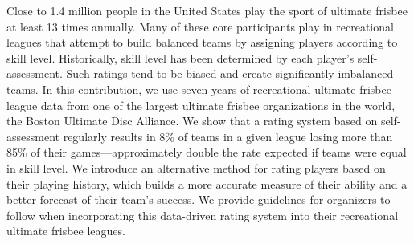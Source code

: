 Close to 1.4 million people in the United States play the sport of ultimate frisbee at least 13 times annually. Many of these core participants play in recreational leagues that attempt to build balanced teams by assigning players according to skill level. Historically, skill level has been determined by each player’s self-assessment. Such ratings tend to be biased and create significantly imbalanced teams. In this contribution, we use seven years of recreational ultimate frisbee league data from one of the largest ultimate frisbee organizations in the world, the Boston Ultimate Disc Alliance. We show that a rating system based on self-assessment regularly results in 8\% of teams in a given league losing more than 85\% of their games---approximately double the rate expected if teams were equal in skill level. We introduce an alternative method for rating players based on their playing history, which builds a more accurate measure of their ability and a better forecast of their team’s success. We provide guidelines for organizers to follow when incorporating this data-driven rating system into their recreational ultimate frisbee leagues.
